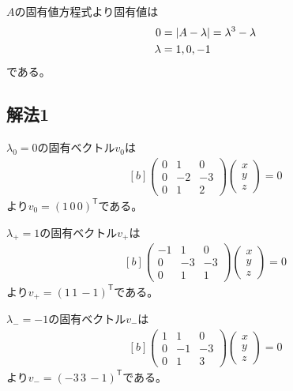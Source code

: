 \documentclass[../ap_2014.tex]{subfiles}
\begin{document}
\subsection{}
\(A\)の固有値方程式より固有値は
\begin{equation}\begin{aligned}[b]
    0 &= \abs{A-\lambda} = \lambda^3-\lambda\\
    \lambda &= 1, 0, -1
\end{aligned}\end{equation}
である。

\subsection*{解法1}
\(\lambda_0=0\)の固有ベクトル\(v_0\)は
\begin{equation}\begin{aligned}[b]
    \begin{pmatrix}
        0 & 1 & 0\\
        0 & -2 & -3\\
        0 & 1 & 2
    \end{pmatrix}\begin{pmatrix}
        x\\
        y\\
        z
    \end{pmatrix}=0
\end{aligned}\end{equation}
より\(v_0 = (1\,0\,0)^\mathsf{T}\)である。

\(\lambda_+=1\)の固有ベクトル\(v_+\)は
\begin{equation}\begin{aligned}[b]
    \begin{pmatrix}
        -1 & 1 & 0\\
        0 & -3 & -3\\
        0 & 1 & 1
    \end{pmatrix}\begin{pmatrix}
        x\\
        y\\
        z
    \end{pmatrix}=0
\end{aligned}\end{equation}
より\(v_+ = (1\,1\,-1)^\mathsf{T}\)である。

\(\lambda_-=-1\)の固有ベクトル\(v_-\)は
\begin{equation}\begin{aligned}[b]
    \begin{pmatrix}
        1 & 1 & 0\\
        0 & -1 & -3\\
        0 & 1 & 3
    \end{pmatrix}\begin{pmatrix}
        x\\
        y\\
        z
    \end{pmatrix}=0
\end{aligned}\end{equation}
より\(v_- = (-3\,3\,-1)^\mathsf{T}\)である。
\end{document}
